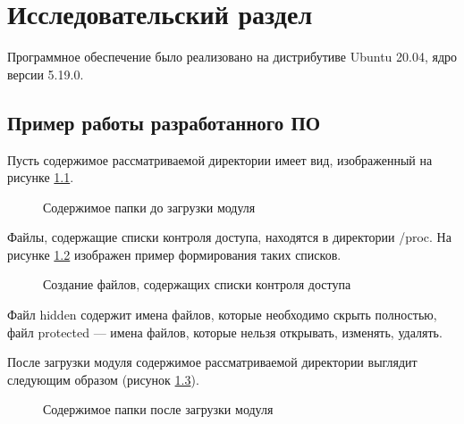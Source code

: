 \chapter{Исследовательский раздел}
\label{cha:research}

Программное обеспечение было реализовано на дистрибутиве Ubuntu 20.04, ядро версии 5.19.0.

\section{Пример работы разработанного ПО}

Пусть содержимое рассматриваемой директории имеет вид, изображенный на рисунке \ref{fig:ls_before}.

\begin{figure}[ph!]
	\caption{Содержимое папки до загрузки модуля}
	\label{fig:ls_before}
\end{figure}

Файлы, содержащие списки контроля доступа, находятся в директории /proc.
На рисунке \ref{fig:proc} изображен пример формирования таких списков. 

\begin{figure}[ph!]
	\caption{Создание файлов, содержащих списки контроля доступа}
	\label{fig:proc}
\end{figure}

Файл hidden содержит имена файлов, которые необходимо скрыть полностью, файл protected ---  имена файлов, которые нельзя открывать, изменять, удалять.

После загрузки модуля содержимое рассматриваемой директории выглядит следующим образом (рисунок \ref{fig:ls_after}).

\begin{figure}[ph!]
	\caption{Содержимое папки после загрузки модуля}
	\label{fig:ls_after}
\end{figure}

